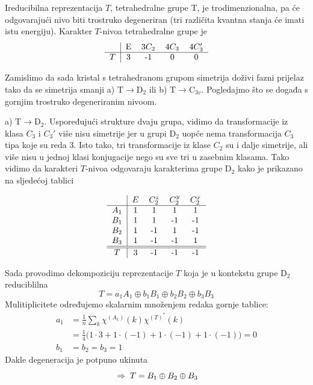 \begin{primjer}

Ireducibilna reprezentacija $T$, tetrahedralne grupe T, je
trodimenzionalna, pa će odgovarajući nivo biti trostruko degeneriran
(tri različita kvantna stanja će imati istu energiju).
Karakter $T$-nivoa tetrahedralne grupe je
\begin{displaymath}
\begin{tabular}{c|cccc}
  & E & 3$C_2$  & 4$C_3$ & 4$C_{3}'$ \\ \hline
 $T$ & 3  & -1 & 0 & 0 
\end{tabular}
\end{displaymath}

Zamislimo da sada kristal s tetrahedranom grupom simetrija doživi
fazni prijelaz tako da se
simetrija smanji a) $\mathrm{T}\to \mathrm{D}_2$ ili b) $\mathrm{T}\to
\mathrm{C}_{3v}$. Pogledajmo
što se događa s gornjim trostruko degeneriranim nivoom.

a) $\mathrm{T}\to \mathrm{D}_2$. Uspoređujući strukture dvaju grupa,
vidimo da transformacije iz klasa $C_3$ i $C_{3}'$ više nisu simetrije
jer u grupi $\mathrm{D}_2$ uopće nema transformacija $C_3$ tipa koje
su reda 3. Isto tako, tri transformacije iz klase $C_2$ su i dalje
simetrije, ali više nisu u jednoj klasi konjugacije nego su sve tri
u zasebnim klasama. Tako vidimo da karakteri $T$-nivoa odgovaraju
karakterima grupe D$_2$ kako je prikazano na sljedećoj tablici

\begin{displaymath}
\begin{tabular}{c|cccc}
 & $E$  & $C_{2}^z$ &  $C_{2}^y$ & $C_{2}^x$ \\ \hline
$A_1$ & 1 & 1& 1 & 1 \\
$B_1$ & 1 & 1&-1  & -1\\
$B_2$ & 1 & -1&1  & -1\\
$B_3$ & 1 & -1&-1  & 1\\ \hline \hline
 $T$ & 3 & -1 & -1 & -1
\end{tabular}
\end{displaymath}

Sada provodimo dekompoziciju reprezentacije $T$ koja je u kontekstu
grupe D$_2$ reduciblilna
\begin{displaymath}
   T = a_1 A_1 \oplus b_1 B_1 \oplus b_2 B_2 \oplus b_3 B_3
\end{displaymath}
Mulitiplicitete određujemo skalarnim množenjem redaka gornje tablice:
\begin{align*}
a_1 &= \frac{1}{n}\sum_k \chi^{(A_1)}(k) \chi^{(T)^*}(k)  \\
    &= \frac{1}{4}\big(1\cdot3 + 1\cdot(-1) + 1\cdot(-1) + 1\cdot(-1)\big) = 0 \\
b_1 &= b_2 = b_3 = 1
\end{align*}
Dakle degeneracija je potpuno ukinuta
\begin{displaymath}
  \;\Rightarrow\;   T =  B_1 \oplus B_2 \oplus B_3
\end{displaymath}


\end{primjer}
